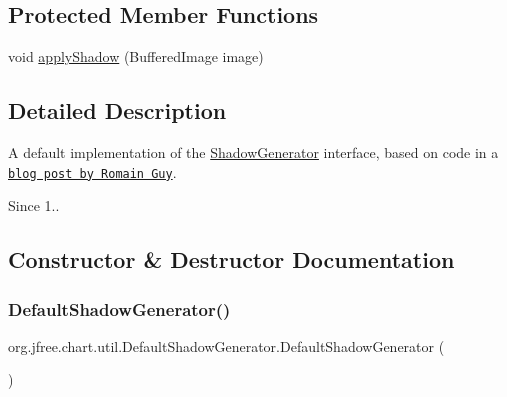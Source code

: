 \subsection*{Protected Member Functions}
\begin{DoxyCompactItemize}
\item 
void \mbox{\hyperlink{classorg_1_1jfree_1_1chart_1_1util_1_1_default_shadow_generator_ac52cd2b7ce93efdaff6f5d99f2461b77}{apply\+Shadow}} (Buffered\+Image image)
\end{DoxyCompactItemize}


\subsection{Detailed Description}
A default implementation of the \mbox{\hyperlink{interfaceorg_1_1jfree_1_1chart_1_1util_1_1_shadow_generator}{Shadow\+Generator}} interface, based on code in a \href{http://www.jroller.com/gfx/entry/fast_or_good_drop_shadows}{\tt blog post by Romain Guy}.

\begin{DoxySince}{Since}
1.. 
\end{DoxySince}


\subsection{Constructor \& Destructor Documentation}
\mbox{\label{classorg_1_1jfree_1_1chart_1_1util_1_1_default_shadow_generator_ae056aa58d30bed7754d9d83adca1d339}} 
\subsubsection{\texorpdfstring{Default\+Shadow\+Generator()}{DefaultShadowGenerator()}\hspace{0.1cm}{\footnotesize\ttfamily [1/2]}}
{\footnotesize\ttfamily org.\+jfree.\+chart.\+util.\+Default\+Shadow\+Generator.\+Default\+Shadow\+Generator (\begin{DoxyParamCaption}{ }\end{DoxyParamCaption})}

